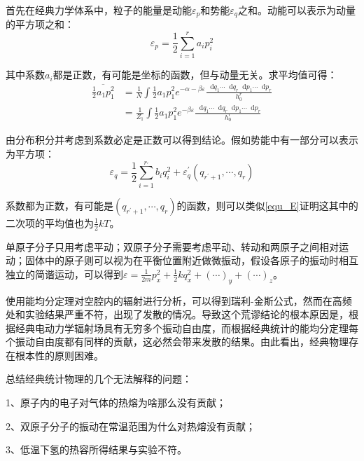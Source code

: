 \documentclass[UTF8]{ctexart}
\newcommand*{\dif}{\mathop{}\!\mathrm{d}}
\begin{document}
	首先在经典力学体系中，粒子的能量是动能$\varepsilon_{p}$和势能$\varepsilon_{q}$之和。动能可以表示为动量的平方项之和：
	\begin{equation}
\varepsilon_{p}=\frac{1}{2} \sum_{i=1}^{r} a_{i} p_{i}^{2}
	\end{equation}

\noindent 其中系数$a_{i}$都是正数，有可能是坐标的函数，但与动量无关。求平均值可得：
	\begin{equation}
	\begin{aligned}
\overline{\frac{1}{2} a_{1} p_{1}^2}&=\frac{1}{N} \int \frac{1}{2} a_{1} p_{1}^2 e^{-\alpha-\beta \varepsilon} \frac{\dif q_{1} \cdots \dif q_{r} \dif p_{1} \cdots \dif p_{r}}{h_{0}^{r}}\\
&=\frac{1}{Z_{1}} \int \frac{1}{2}a_{1}p_{1}^{2} e^{-\beta \varepsilon}\frac{\dif q_{1} \cdots \dif q_{r} \dif p_{1} \cdots \dif p_{r}}{h_{0}^{r}}\label{equ_E}
	\end{aligned}
	\end{equation}

\noindent 由分布积分并考虑到系数必定是正数可以得到结论。假如势能中有一部分可以表示为平方项：
	\begin{equation}
		\varepsilon_{q}=\frac{1}{2}\sum_{i=1}^{r_{'}} b_{i} q_{i}^{2}+\varepsilon_{q}^{'} \left( q_{r^{'}+1},\cdots , q_{r}\right)
	\end{equation}

\noindent 系数都为正数，有可能是$ \left( q_{r^{'}+1},\cdots , q_{r}\right) $的函数，则可以类似\ref{equ_E}证明这其中的二次项的平均值也为$ \frac{1}{2} k T $。

	单原子分子只用考虑平动；双原子分子需要考虑平动、转动和两原子之间相对运动；固体中的原子则可以视为在平衡位置附近做微振动，假设各原子的振动时相互独立的简谐运动，可以得到$\varepsilon=\frac{1}{2 m} p_{x}^{2}+\frac{1}{2} k q_{x}^{2}+(\cdots)_{y}+(\cdots)_{z}$。
	
	使用能均分定理对空腔内的辐射进行分析，可以得到瑞利-金斯公式，然而在高频处和实验结果严重不符，出现了发散的情况。导致这个荒谬结论的根本原因是，根据经典电动力学辐射场具有无穷多个振动自由度，而根据经典统计的能均分定理每个振动自由度都有同样的贡献，这必然会带来发散的结果。由此看出，经典物理存在根本性的原则困难。
	
	总结经典统计物理的几个无法解释的问题：
	
	1、原子内的电子对气体的热熔为啥那么没有贡献；
	
	2、双原子分子的振动在常温范围为什么对热熔没有贡献；
	
	3、低温下氢的热容所得结果与实验不符。
	
\end{document}
